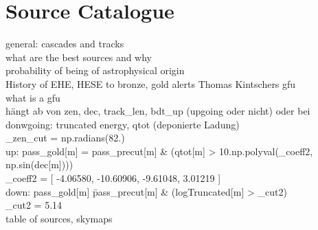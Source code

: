 \chapter{Source Catalogue}
general: cascades and tracks\\
what are the best sources and why\\
probability of being of astrophysical origin\\
History of EHE, HESE to bronze, gold alerts Thomas Kintschers gfu\\
what is a gfu\\
hängt ab von zen, dec, track\_len, bdt\_up (upgoing oder nicht) oder bei donwgoing: truncated energy, qtot (deponierte Ladung)\\
\_zen\_cut = np.radians(82.)\\
up: pass\_gold[m]   = pass\_precut[m] \& (qtot[m] > 10.\*\*np.polyval(\_coeff2, np.sin(dec[m])))\\
\_coeff2 = [  -4.06580, -10.60906,  -9.61048,   3.01219 ]\\
down: pass\_gold[m]   \= pass\_precut[m] \& (logTruncated[m] > \_cut2)\\
\_cut2   = 5.14\\

table of sources, skymaps\\
